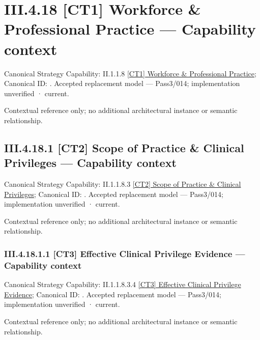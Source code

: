 \section*{III.4.18 [CT1] Workforce \& Professional Practice — Capability context}
\label{navigation:III.4.18}

{\small Canonical Strategy Capability: II.1.1.8 \hyperref[element:4be7b3b9fd754a20890302153203d5a1]{[CT1] Workforce \& Professional Practice}; Canonical ID: \texttt{}. Accepted replacement model — Pass3/014; implementation unverified · current.}\par
Contextual reference only; no additional architectural instance or semantic relationship.\par
\subsection*{III.4.18.1 [CT2] Scope of Practice \& Clinical Privileges — Capability context}
\label{navigation:III.4.18.1}

{\small Canonical Strategy Capability: II.1.1.8.3 \hyperref[element:eef619227c014eb2803da8a9e47635fe]{[CT2] Scope of Practice \& Clinical Privileges}; Canonical ID: \texttt{}. Accepted replacement model — Pass3/014; implementation unverified · current.}\par
Contextual reference only; no additional architectural instance or semantic relationship.\par
\subsubsection*{III.4.18.1.1 [CT3] Effective Clinical Privilege Evidence — Capability context}
\label{navigation:III.4.18.1.1}

{\small Canonical Strategy Capability: II.1.1.8.3.4 \hyperref[element:addeadbd69fe470198b32c563f476f75]{[CT3] Effective Clinical Privilege Evidence}; Canonical ID: \texttt{}. Accepted replacement model — Pass3/014; implementation unverified · current.}\par
Contextual reference only; no additional architectural instance or semantic relationship.\par
